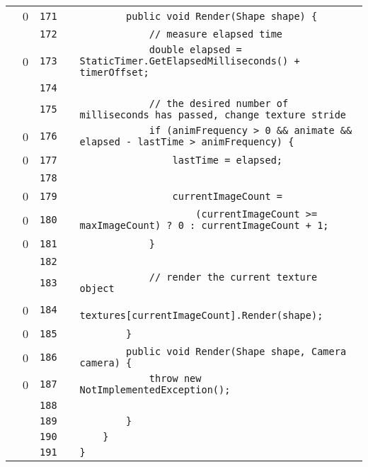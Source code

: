 \documentclass[a4paper,landscape,10pt]{article}
\begin{document}
\begin{longtable}[l]{lrrll}
\cellcolor{red} & 0 & \verb~171~ & & \verb~        public void Render(Shape shape) {~\\
\cellcolor{gray} &  & \verb~172~ & & \verb~            // measure elapsed time~\\
\cellcolor{red} & 0 & \verb~173~ & & \verb~            double elapsed = StaticTimer.GetElapsedMilliseconds() + timerOffset;~\\
\cellcolor{gray} &  & \verb~174~ & & \verb~~\\
\cellcolor{gray} &  & \verb~175~ & & \verb~            // the desired number of milliseconds has passed, change texture stride~\\
\cellcolor{red} & 0 & \verb~176~ & & \verb~            if (animFrequency > 0 && animate && elapsed - lastTime > animFrequency) {~\\
\cellcolor{red} & 0 & \verb~177~ & & \verb~                lastTime = elapsed;~\\
\cellcolor{gray} &  & \verb~178~ & & \verb~~\\
\cellcolor{red} & 0 & \verb~179~ & & \verb~                currentImageCount =~\\
\cellcolor{red} & 0 & \verb~180~ & & \verb~                    (currentImageCount >= maxImageCount) ? 0 : currentImageCount + 1;~\\
\cellcolor{red} & 0 & \verb~181~ & & \verb~            }~\\
\cellcolor{gray} &  & \verb~182~ & & \verb~~\\
\cellcolor{gray} &  & \verb~183~ & & \verb~            // render the current texture object~\\
\cellcolor{red} & 0 & \verb~184~ & & \verb~            textures[currentImageCount].Render(shape);~\\
\cellcolor{red} & 0 & \verb~185~ & & \verb~        }~\\
\cellcolor{red} & 0 & \verb~186~ & & \verb~        public void Render(Shape shape, Camera camera) {~\\
\cellcolor{red} & 0 & \verb~187~ & & \verb~            throw new NotImplementedException();~\\
\cellcolor{gray} &  & \verb~188~ & & \verb~~\\
\cellcolor{gray} &  & \verb~189~ & & \verb~        }~\\
\cellcolor{gray} &  & \verb~190~ & & \verb~    }~\\
\cellcolor{gray} &  & \verb~191~ & & \verb~}~\\
\end{longtable}
\newpage
\end{document}
